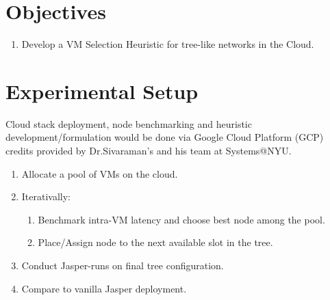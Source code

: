 \documentclass{article}
\begin{document}
\section{Objectives}
\begin{enumerate}
    \item Develop a VM Selection Heuristic for tree-like networks in the Cloud.
\end{enumerate}

\section{Experimental Setup}
Cloud stack deployment, node benchmarking and heuristic development/formulation would be done 
via Google Cloud Platform (GCP) credits provided by Dr.Sivaraman's and his team at Systems@NYU.

\begin{enumerate}
    \item Allocate a pool of VMs on the cloud.
    \item Iterativally:
    \begin{enumerate}
        \item Benchmark intra-VM latency and choose best node among the pool.
        \item Place/Assign node to the next available slot in the tree.
    \end{enumerate}
    \item Conduct Jasper-runs on final tree configuration.
    \item Compare to vanilla Jasper deployment.
\end{enumerate}


    
\end{document}
